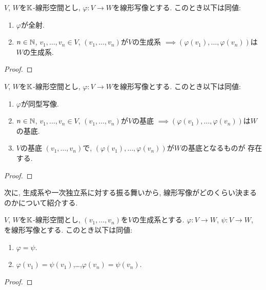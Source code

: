 \begin{prop}
  $V$, $W$を$\mathbb{K}$-線形空間とし,
  $\varphi\colon V\to W$を線形写像とする.
  このとき以下は同値:
  \begin{enumerate}
  \item $\varphi$が全射.
  \item $n\in \mathbb{N}$, $v_1,\ldots,v_n\in V$,
    $(v_1,\ldots,v_n)$が$V$の生成系
    $\implies (\varphi(v_1),\ldots,\varphi(v_n))$は$W$の生成系.
  \end{enumerate}
\end{prop}
\begin{proof}\end{proof}

\begin{prop}
  $V$, $W$を$\mathbb{K}$-線形空間とし,
  $\varphi\colon V\to W$を線形写像とする.
  このとき以下は同値:
  \begin{enumerate}
  \item $\varphi$が同型写像.
  \item $n\in \mathbb{N}$, $v_1,\ldots,v_n\in V$,
    $(v_1,\ldots,v_n)$が$V$の基底
    $\implies (\varphi(v_1),\ldots,\varphi(v_n))$は$W$の基底.
  \item $V$の基底
    $(v_1,\ldots,v_n)$で,
    $(\varphi(v_1),\ldots,\varphi(v_n))$が$W$の基底となるものが
    存在する.
  \end{enumerate}
\end{prop}
\begin{proof}\end{proof}

次に,
生成系や一次独立系に対する振る舞いから,
線形写像がどのくらい決まるのかについて紹介する.
\begin{prop}
  $V$, $W$を$\mathbb{K}$-線形空間とし,
  $(v_1,\ldots,v_n)$を$V$の生成系とする.
  $\varphi\colon V\to W$,
  $\psi\colon V\to W$,
  を線形写像とする.
  このとき以下は同値:
  \begin{enumerate}
  \item $\varphi=\psi$.
  \item $\varphi(v_1)=\psi(v_1)$,\ldots,$\varphi(v_n)=\psi(v_n)$.
  \end{enumerate}
\end{prop}
\begin{proof}\end{proof}

